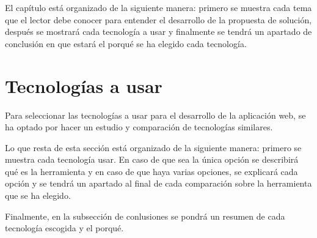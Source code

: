 El capítulo está organizado de la siguiente manera: primero se muestra cada tema que el lector debe conocer para entender el desarrollo de la propuesta de solución, después se mostrará cada tecnología a usar y finalmente se tendrá un apartado de conclusión en que estará el porqué se ha elegido cada tecnología.


 
 

 
%






\section{Tecnologías a usar}
Para seleccionar las tecnologías a usar para el desarrollo de la aplicación web, se ha optado por hacer un estudio y comparación de tecnologías similares.


Lo que resta de esta sección está organizado de la siguiente manera: primero se muestra cada tecnología usar. En caso de que sea la única opción se describirá qué es la herramienta y en caso de que haya varias opciones, se explicará cada opción y se tendrá un apartado al final de cada comparación sobre la herramienta que se ha elegido.


Finalmente, en la subsección de conlusiones se pondrá un resumen de cada tecnología escogida y el porqué.










